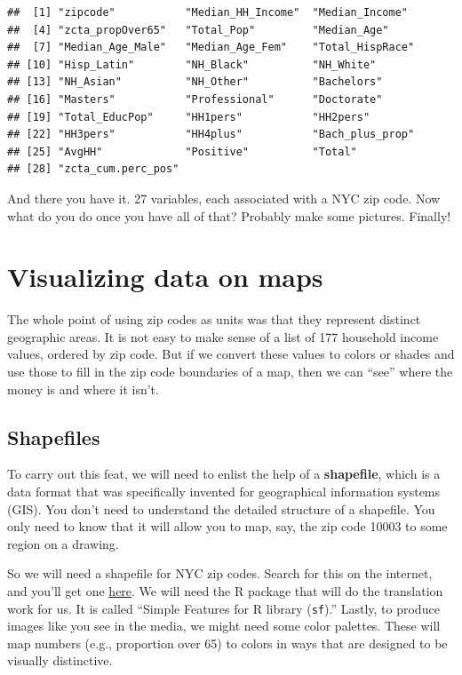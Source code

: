 \documentclass[
  openany]{book}
\begin{document}
\begin{verbatim}
##  [1] "zipcode"           "Median_HH_Income"  "Median_Income"    
##  [4] "zcta_propOver65"   "Total_Pop"         "Median_Age"       
##  [7] "Median_Age_Male"   "Median_Age_Fem"    "Total_HispRace"   
## [10] "Hisp_Latin"        "NH_Black"          "NH_White"         
## [13] "NH_Asian"          "NH_Other"          "Bachelors"        
## [16] "Masters"           "Professional"      "Doctorate"        
## [19] "Total_EducPop"     "HH1pers"           "HH2pers"          
## [22] "HH3pers"           "HH4plus"           "Bach_plus_prop"   
## [25] "AvgHH"             "Positive"          "Total"            
## [28] "zcta_cum.perc_pos"
\end{verbatim}

And there you have it. 27 variables, each associated with a NYC zip code. Now what do you do once you have all of that? Probably make some pictures. Finally!

\hypertarget{mapviz}{%
\section{Visualizing data on maps}\label{mapviz}}

The whole point of using zip codes as units was that they represent distinct geographic areas. It is not easy to make sense of a list of 177 household income values, ordered by zip code. But if we convert these values to colors or shades and use those to fill in the zip code boundaries of a map, then we can ``see'' where the money is and where it isn't.

\hypertarget{shapefiles}{%
\subsection*{Shapefiles}\label{shapefiles}}

To carry out this feat, we will need to enlist the help of a \textbf{shapefile}, which is a data format that was specifically invented for geographical information systems (GIS). You don't need to understand the detailed structure of a shapefile. You only need to know that it will allow you to map, say, the zip code 10003 to some region on a drawing.

So we will need a shapefile for NYC zip codes. Search for this on the internet, and you'll get one \href{https://catalog.data.gov/dataset/zip-code-boundaries}{here}. We will need the R package that will do the translation work for us. It is called ``Simple Features for R library (\texttt{sf}).'' Lastly, to produce images like you see in the media, we might need some color palettes. These will map numbers (e.g., proportion over 65) to colors in ways that are designed to be visually distinctive.
\end{document}
